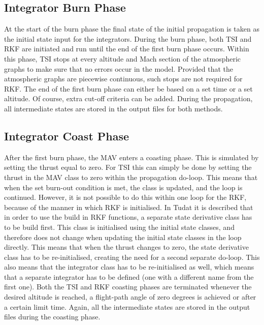 \subsection{Integrator Burn Phase}
\label{subsec:integratorBurnPhase}
At the start of the burn phase the final state of the initial propagation is taken as the initial state input for the integrators. During the burn phase, both \ac{TSI} and \ac{RKF} are initiated and run until the end of the first burn phase occurs. Within this phase, \ac{TSI} stops at every altitude and Mach section of the atmospheric graphs to make sure that no errors occur in the model. Provided that the atmospheric graphs are piecewise continuous, such stops are not required for \ac{RKF}. The end of the first burn phase can either be based on a set time or a set altitude. Of course, extra cut-off criteria can be added. During the propagation, all intermediate states are stored in the output files for both methods.


\subsection{Integrator Coast Phase}
\label{subsec:integratorCoastPhase}
After the first burn phase, the \ac{MAV} enters a coasting phase. This is simulated by setting the thrust equal to zero. For \ac{TSI} this can simply be done by setting the thrust in the \ac{MAV} class to zero within the propagation do-loop. This means that when the set burn-out condition is met, the class is updated, and the loop is continued. However, it is not possible to do this within one loop for the \ac{RKF}, because of the manner in which \ac{RKF} is initialised. In \ac{Tudat} it is described that in order to use the build in \ac{RKF} functions, a separate state derivative class has to be build first. This class is initialised using the initial state classes, and therefore does not change when updating the initial state classes in the loop directly. This means that when the thrust changes to zero, the state derivative class has to be re-initialised, creating the need for a second separate do-loop. This also means that the integrator class has to be re-initialised as well, which means that a separate integrator has to be defined (one with a different name from the first one). Both the \ac{TSI} and \ac{RKF} coasting phases are terminated whenever the desired altitude is reached, a flight-path angle of zero degrees is achieved or after a certain limit time. Again, all the intermediate states are stored in the output files during the coasting phase.


